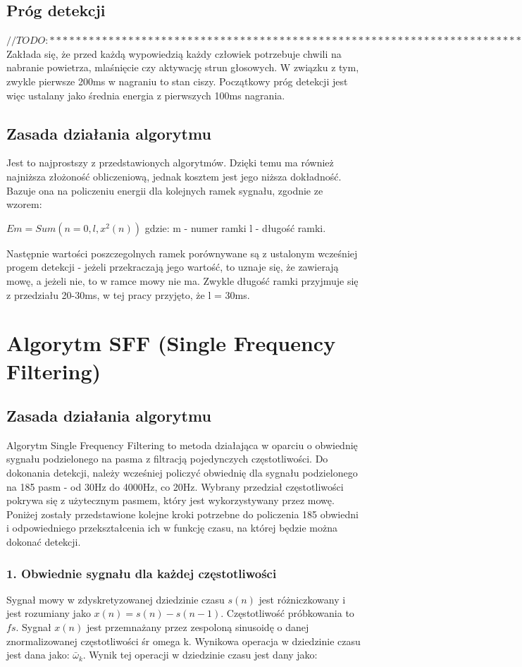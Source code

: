 \documentclass[eng,printmode]{mgr}
\begin{document}
 \subsection{Próg detekcji}
 $//TODO:******************************************************************************$
 Zakłada się, że przed każdą wypowiedzią każdy człowiek potrzebuje chwili na nabranie powietrza, mlaśnięcie czy aktywację strun głosowych. W związku z tym, zwykle pierwsze 200ms w nagraniu to stan ciszy. Początkowy próg detekcji jest więc ustalany jako średnia energia z pierwszych 100ms nagrania.
 \subsection{Zasada działania algorytmu}
 Jest to  najprostszy z przedstawionych algorytmów. Dzięki temu ma również najniższa złożoność obliczeniową, jednak kosztem jest jego niższa dokładność. Bazuje ona na policzeniu energii dla kolejnych ramek sygnału, zgodnie ze wzorem:
 
$ Em = Sum(n=0, l, x^2(n))$
		gdzie: m - numer ramki
				l - długość ramki.
				
		Następnie wartości poszczegolnych ramek porównywane są z ustalonym wcześniej progem detekcji - jeżeli przekraczają jego wartość, to uznaje się, że zawierają mowę, a jeżeli nie, to w ramce mowy nie ma. Zwykle długość ramki przyjmuje się z przedziału 20-30ms, w tej pracy przyjęto, że l = 30ms. 
		

 \section{Algorytm SFF (Single Frequency Filtering)} 
 \subsection{Zasada działania algorytmu}
 Algorytm Single Frequency Filtering to metoda działająca w oparciu o obwiednię sygnału podzielonego na pasma z filtracją pojedynczych częstotliwości. Do dokonania detekcji, należy wcześniej policzyć obwiednię dla sygnału podzielonego na 185 pasm - od 30Hz do 4000Hz, co 20Hz. Wybrany przedział częstotliwości pokrywa się z użytecznym pasmem, który jest wykorzystywany przez mowę. Poniżej zostały przedstawione kolejne kroki potrzebne do policzenia 185 obwiedni i odpowiedniego przekształcenia ich w funkcję czasu, na której będzie można dokonać detekcji.
 
 \subsubsection{1. Obwiednie sygnału dla każdej częstotliwości}
 Sygnał mowy w zdyskretyzowanej dziedzinie czasu $s(n)$ jest różniczkowany i jest rozumiany jako $x(n) = s(n) - s(n-1)$. Częstotliwość próbkowania to $fs$. Sygnał $x(n)$ jest przemnażany przez zespoloną sinusoidę o danej znormalizowanej częstotliwości śr omega k. Wynikowa operacja w dziedzinie czasu jest dana jako: $\bar{\omega}_{k}$. Wynik tej operacji w dziedzinie czasu jest dany jako: 
 
\end{document}
